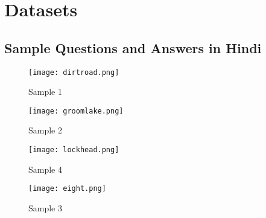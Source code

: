 \documentclass[12pt]{article}   %
\begin{document}



\appendix
\section{Datasets}

\subsection{Sample Questions and Answers in Hindi}


\begin{figure}[h]
\centering

\texttt{[image: dirtroad.png]}
\caption{Sample 1}
\label{fig:dirtroad}
\end{figure}

\begin{figure}[h]
\centering
\texttt{[image: groomlake.png]}
\caption{Sample 2}
\label{fig:groomlake}
\end{figure}

\begin{figure}[h]
\centering
\texttt{[image: lockhead.png]}
\caption{Sample 4}
\label{fig:lockhead}

\end{figure}

\begin{figure}[h]
\centering
\texttt{[image: eight.png]}
\caption{Sample 3}
\label{fig:eight}
\end{figure}
\end{document}
